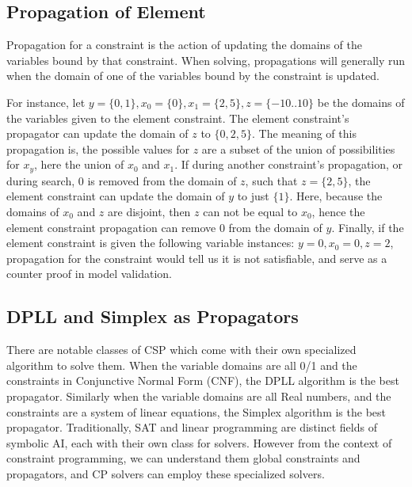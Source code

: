 \subsection{Propagation of Element}
Propagation for a constraint is the action of updating the domains of the variables bound by that constraint.
When solving, propagations will generally run when the domain of one of the variables bound by the constraint is updated.

For instance, let $y=\{0,1\},x_0=\{0\},x_1=\{2,5\}, z=\{-10..10\}$ be the domains of the variables given to the element constraint.
The element constraint's propagator can update the domain of $z$ to $\{0,2,5\}$.
The meaning of this propagation is, the possible values for $z$ are a subset of the union of possibilities for $x_y$, here the union of $x_0$ and $x_1$.
If during another constraint's propagation, or during search, 0 is removed from the domain of $z$, such that $z=\{2,5\}$, the element constraint can update the domain of $y$ to just $\{1\}$.
Here, because the domains of $x_0$ and $z$ are disjoint, then $z$ can not be equal to $x_0$, hence the element constraint propagation can remove 0 from the domain of $y$.
Finally, if the element constraint is given the following variable instances: $y=0, x_0=0, z=2$, propagation for the constraint would tell us it is not satisfiable, and serve as a counter proof in model validation.

\subsection{DPLL and Simplex as Propagators}
There are notable classes of CSP which come with their own specialized algorithm to solve them.
When the variable domains are all 0/1 and the constraints in Conjunctive Normal Form (CNF), the DPLL algorithm is the best propagator.
Similarly when the variable domains are all Real numbers, and the constraints are a system of linear equations, the Simplex algorithm is the best propagator.
Traditionally, SAT and linear programming are distinct fields of symbolic AI, each with their own class for solvers. 
However from the context of constraint programming, we can understand them global constraints and propagators, and CP solvers can employ these specialized solvers.